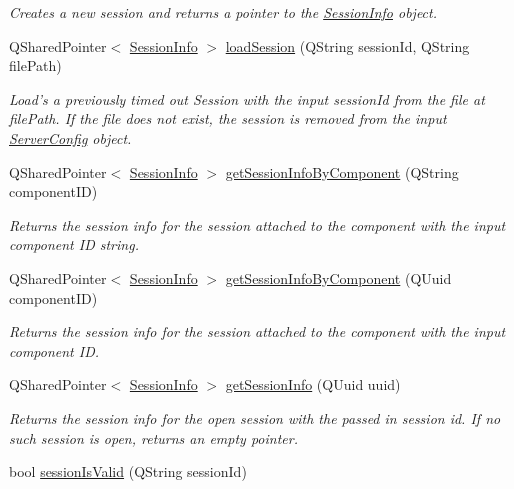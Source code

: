 \begin{DoxyCompactItemize}
\begin{DoxyCompactList}\small\item\em Creates a new session and returns a pointer to the \hyperlink{class_session_info}{Session\-Info} object. \end{DoxyCompactList}\item 
\hypertarget{class_connection_manager_a86811fb45f5dc933975acecf6bf7788a}{Q\-Shared\-Pointer$<$ \hyperlink{class_session_info}{Session\-Info} $>$ \hyperlink{class_connection_manager_a86811fb45f5dc933975acecf6bf7788a}{load\-Session} (Q\-String session\-Id, Q\-String file\-Path)}\label{class_connection_manager_a86811fb45f5dc933975acecf6bf7788a}

\begin{DoxyCompactList}\small\item\em Load's a previously timed out Session with the input session\-Id from the file at file\-Path. If the file does not exist, the session is removed from the input \hyperlink{class_server_config}{Server\-Config} object. \end{DoxyCompactList}\item 
Q\-Shared\-Pointer$<$ \hyperlink{class_session_info}{Session\-Info} $>$ \hyperlink{class_connection_manager_aff1c3942e20523922e9ef264bce83c77}{get\-Session\-Info\-By\-Component} (Q\-String component\-I\-D)
\begin{DoxyCompactList}\small\item\em Returns the session info for the session attached to the component with the input component I\-D string. \end{DoxyCompactList}\item 
Q\-Shared\-Pointer$<$ \hyperlink{class_session_info}{Session\-Info} $>$ \hyperlink{class_connection_manager_a3248768ab6c18c6cceed2a024924dd1e}{get\-Session\-Info\-By\-Component} (Q\-Uuid component\-I\-D)
\begin{DoxyCompactList}\small\item\em Returns the session info for the session attached to the component with the input component I\-D. \end{DoxyCompactList}\item 
\hypertarget{class_connection_manager_a6608548da05a185b1e7a4a3361974766}{Q\-Shared\-Pointer$<$ \hyperlink{class_session_info}{Session\-Info} $>$ \hyperlink{class_connection_manager_a6608548da05a185b1e7a4a3361974766}{get\-Session\-Info} (Q\-Uuid uuid)}\label{class_connection_manager_a6608548da05a185b1e7a4a3361974766}

\begin{DoxyCompactList}\small\item\em Returns the session info for the open session with the passed in session id. If no such session is open, returns an empty pointer. \end{DoxyCompactList}\item 
\hypertarget{class_connection_manager_a6a6e5a39b29a164c12b72dfe33a767e9}{bool \hyperlink{class_connection_manager_a6a6e5a39b29a164c12b72dfe33a767e9}{session\-Is\-Valid} (Q\-String session\-Id)}\label{class_connection_manager_a6a6e5a39b29a164c12b72dfe33a767e9}


\end{DoxyCompactItemize}
